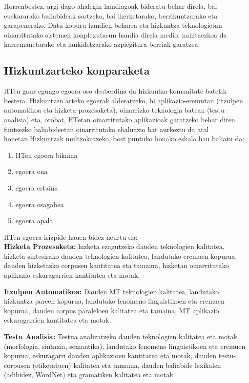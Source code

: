 \begin{multicols}{2}
Horrenbestez, argi dago ahalegin handiagoak bideratu behar direla, bai euskararako baliabideak sortzeko, bai ikerketarako, berrikuntzarako eta garapenerako. Datu kopuru handien beharra eta hizkuntza-teknologietan oinarritutako sistemen konplexutasun handia direla medio, nahitaezkoa da harremanetarako eta lankidetzarako azpiegitura berriak garatzea.

\subsection{Hizkuntzarteko konparaketa}
    HTen gaur egungo egoera oso desberdina da hizkuntza-komunitate batetik bestera. Hizkuntzen arteko egoerak alderatzeko, bi aplikazio-eremutan (itzulpen automatikoa eta hizketa-prozesaketa), oinarrizko teknologia batean (testu-analisia) eta, orobat, HTetan oinarritutako aplikazioak garatzeko behar diren funtsezko baliabideetan oinarritutako ebaluazio bat aurkeztu da atal honetan.Hizkuntzak multzokatzeko, bost puntuko honako eskala hau baliatu da:

\begin{enumerate}
\item HTen egoera bikaina
\item egoera ona
\item egoera ertaina
\item egoera osagabea
\item egoera apala
\end{enumerate}

HTen egoera irizpide hauen bidez neurtu da:\\
\textbf{Hizketa Prozesaketa:} hizketa ezagutzeko dauden teknologien kalitatea, hizketa-sintesirako dauden teknologien kalitatea, landutako eremuen kopurua, dauden hizketazko corpusen kantitatea eta tamaina, hizketan oinarritutako aplikazio eskuragarrien kantitatea eta motak.

\textbf{Itzulpen Automatikoa:} Dauden MT teknologien kalitatea, landutako hizkuntza pareen kopurua, landutako fenomeno linguistikoen eta eremuen kopurua, dauden corpus paraleloen kalitatea eta tamaina, MT aplikazio eskuragarrien kantitatea eta motak.

\textbf{Testu Analisia:} Testua analizatzeko dauden teknologien kalitatea eta motak (morfologia, sintaxia, semantika), landutako fenomeno linguistikoen eta eremuen kopurua, eskuragarri dauden aplikazioen kantitatea eta motak, dauden testu-corpusen (etiketatuen) kalitatea eta tamaina, dauden baliabide lexikalen (adibidez, WordNet) eta gramatiken kalitatea eta motak.


\end{multicols}
